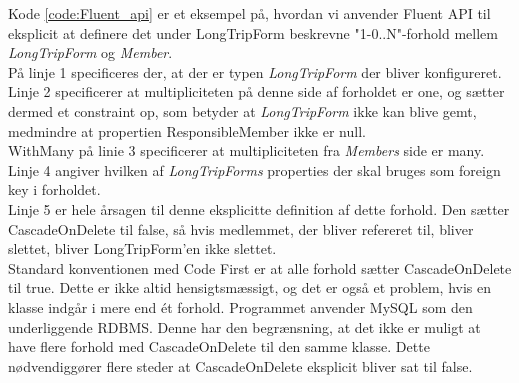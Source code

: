
Kode \ref{code:Fluent_api} er et eksempel på, hvordan vi anvender Fluent API til eksplicit at definere det under LongTripForm beskrevne "1-0..N"\mbox{}-forhold mellem \textit{LongTripForm} og \textit{Member}.\\
På linje 1 specificeres der, at der er typen \textit{LongTripForm} der bliver konfigureret.\\
Linje 2 specificerer at multipliciteten på denne side af forholdet er one, og sætter dermed et constraint op, som betyder at \textit{LongTripForm} ikke kan blive gemt, medmindre at propertien ResponsibleMember ikke er null.\\
WithMany på linie 3 specificerer at multipliciteten fra \textit{Members} side er many.\\
Linje 4 angiver hvilken af \textit{LongTripForms} properties der skal bruges som foreign key i forholdet.\\
Linje 5 er hele årsagen til denne eksplicitte definition af dette forhold. Den sætter CascadeOnDelete til false, så hvis medlemmet, der bliver refereret til, bliver slettet, bliver LongTripForm'en ikke slettet.\\ 
Standard konventionen med Code First er at alle forhold sætter CascadeOnDelete til true.
Dette er ikke altid hensigtsmæssigt, og det er også et problem, hvis en klasse indgår i mere end ét forhold. Programmet anvender MySQL som den underliggende RDBMS. Denne har den begrænsning, at det ikke er muligt at have flere forhold med CascadeOnDelete til den samme klasse. Dette nødvendiggører flere steder at CascadeOnDelete eksplicit bliver sat til false.
